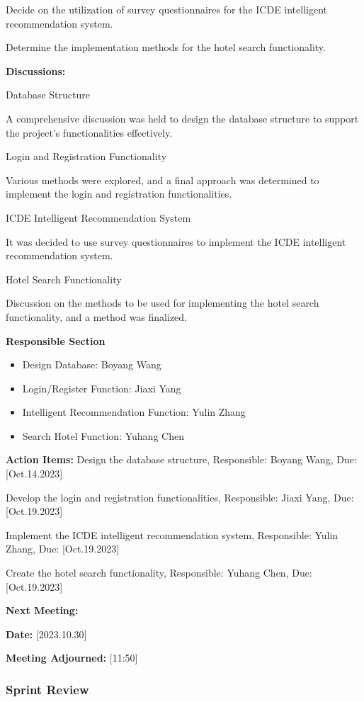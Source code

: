 \documentclass[conference]{IEEEtran}
\begin{document}
Decide on the utilization of survey questionnaires for the ICDE intelligent recommendation system.

Determine the implementation methods for the hotel search functionality.

\textbf{Discussions:}

Database Structure

A comprehensive discussion was held to design the database structure to support the project's functionalities effectively.

Login and Registration Functionality

Various methods were explored, and a final approach was determined to implement the login and registration functionalities.

ICDE Intelligent Recommendation System

It was decided to use survey questionnaires to implement the ICDE intelligent recommendation system.

Hotel Search Functionality

Discussion on the methods to be used for implementing the hotel search functionality, and a method was finalized.

\textbf{Responsible Section}
\begin{itemize}
\item Design Database: Boyang Wang
\item Login/Register Function: Jiaxi Yang
\item Intelligent Recommendation Function: Yulin Zhang
\item Search Hotel Function: Yuhang Chen
\end{itemize}
\textbf{Action Items:}
Design the database structure, Responsible: Boyang Wang, Due: [Oct.14.2023]

Develop the login and registration functionalities, Responsible: Jiaxi Yang, Due: [Oct.19.2023]

Implement the ICDE intelligent recommendation system, Responsible: Yulin Zhang, Due: [Oct.19.2023]

Create the hotel search functionality, Responsible: Yuhang Chen, Due: [Oct.19.2023]

\textbf{Next Meeting:}

\textbf{Date:} [2023.10.30]

\textbf{Meeting Adjourned:} [11:50]

\subsubsection{\textbf{Sprint Review}}
\end{document}
